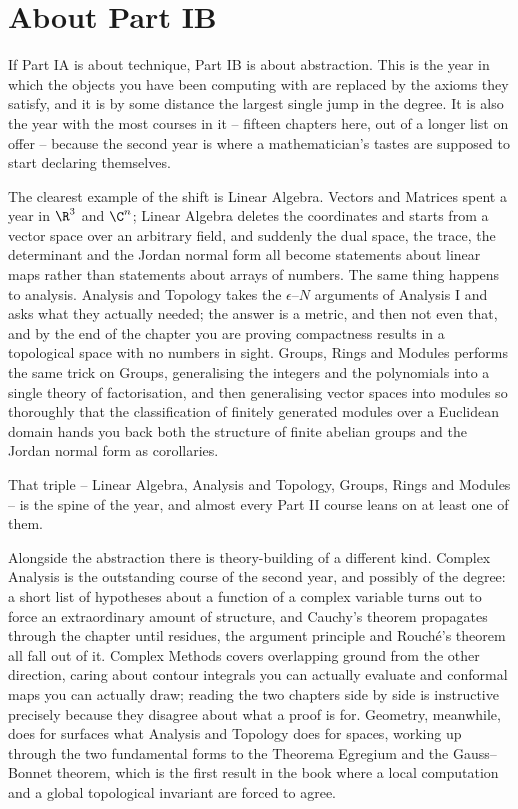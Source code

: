 {}
\section*{About Part IB}

If Part IA is about technique, Part IB is about abstraction. This is the year in which
the objects you have been computing with are replaced by the axioms they satisfy, and
it is by some distance the largest single jump in the degree. It is also the year with
the most courses in it -- fifteen chapters here, out of a longer list on offer --
because the second year is where a mathematician's tastes are supposed to start
declaring themselves.

The clearest example of the shift is Linear Algebra. Vectors and Matrices spent a year
in $\R^3$ and $\C^n$; Linear Algebra deletes the coordinates and starts from a vector
space over an arbitrary field, and suddenly the dual space, the trace, the determinant
and the Jordan normal form all become statements about linear maps rather than
statements about arrays of numbers. The same thing happens to analysis. Analysis and
Topology takes the $\epsilon$--$N$ arguments of Analysis I and asks what they actually
needed; the answer is a metric, and then not even that, and by the end of the chapter
you are proving compactness results in a topological space with no numbers in sight.
Groups, Rings and Modules performs the same trick on Groups, generalising the integers
and the polynomials into a single theory of factorisation, and then generalising vector
spaces into modules so thoroughly that the classification of finitely generated modules
over a Euclidean domain hands you back both the structure of finite abelian groups and
the Jordan normal form as corollaries.

That triple -- Linear Algebra, Analysis and Topology, Groups, Rings and Modules -- is
the spine of the year, and almost every Part II course leans on at least one of them.

Alongside the abstraction there is theory-building of a different kind. Complex Analysis
is the outstanding course of the second year, and possibly of the degree: a short list
of hypotheses about a function of a complex variable turns out to force an
extraordinary amount of structure, and Cauchy's theorem propagates through the chapter
until residues, the argument principle and Rouch\'e's theorem all fall out of it.
Complex Methods covers overlapping ground from the other direction, caring about
contour integrals you can actually evaluate and conformal maps you can actually draw;
reading the two chapters side by side is instructive precisely because they disagree
about what a proof is for. Geometry, meanwhile, does for surfaces what Analysis and
Topology does for spaces, working up through the two fundamental forms to the
Theorema Egregium and the Gauss--Bonnet theorem, which is the first result in the book
where a local computation and a global topological invariant are forced to agree.


